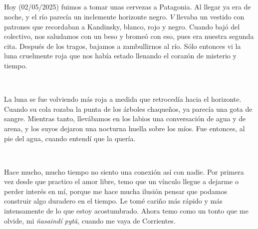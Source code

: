 \documentclass[a4paper, 12pt]{article}
\begin{document}
\subsection{}

Hoy (02/05/2025) fuimos a tomar unas cervezas a Patagonia. Al llegar ya era de
noche, y el río parecía un inclemente horizonte negro. $V$ llevaba un vestido con
patrones que recordaban a Kandinsky, blanco, rojo y negro. Cuando bajó del 
colectivo, nos saludamos con un beso y bromeó con eso, pues era nuestra
segunda cita. Después de los tragos, bajamos a zambullirnos al río. Sólo 
entonces vi la luna cruelmente roja que nos había estado llenando el corazón de
misterio y tiempo.

~

La luna se fue volviendo más roja a medida que retrocedía hacia el horizonte.
Cuando su cola rozaba la punta de los árboles chaqueños, ya parecía una gota de
sangre. Mientras tanto, llevábamos en los labios una conversación de agua y de
arena, y los suyos dejaron una nocturna huella sobre los míos. Fue entonces,
al pie del agua, cuando entendí que la quería.

~ 

Hace mucho, mucho tiempo no siento una conexión así con nadie. Por primera vez
desde que practico el amor libre, temo que un vínculo llegue a dejarme o perder
interés en mí, porque me hace mucha ilusión pensar que podamos construir algo
duradero en el tiempo. Le tomé cariño más rápido y más intensamente de lo que
estoy acostumbrado. Ahora temo como un tonto que me olvide, mi \textit{ñasaindí pytã},
cuando me vaya de Corrientes.
\end{document}
